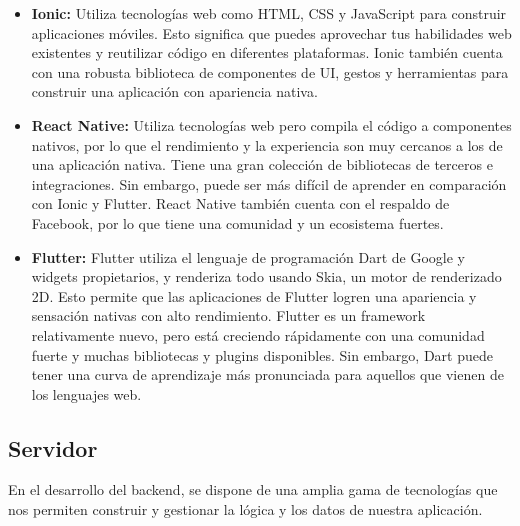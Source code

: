 \begin{itemize}
	\item \textbf{Ionic:} Utiliza tecnologías web como HTML, CSS y JavaScript para construir aplicaciones móviles. Esto significa que puedes aprovechar tus habilidades web existentes y reutilizar código en diferentes plataformas. Ionic también cuenta con una robusta biblioteca de componentes de UI, gestos y herramientas para construir una aplicación con apariencia nativa.
	\item \textbf{React Native:} Utiliza tecnologías web pero compila el código a componentes nativos, por lo que el rendimiento y la experiencia son muy cercanos a los de una aplicación nativa. Tiene una gran colección de bibliotecas de terceros e integraciones. Sin embargo, puede ser más difícil de aprender en comparación con Ionic y Flutter. React Native también cuenta con el respaldo de Facebook, por lo que tiene una comunidad y un ecosistema fuertes.
	\item \textbf{Flutter:} Flutter utiliza el lenguaje de programación Dart de Google y widgets propietarios, y renderiza todo usando Skia, un motor de renderizado 2D. Esto permite que las aplicaciones de Flutter logren una apariencia y sensación nativas con alto rendimiento. Flutter es un framework relativamente nuevo, pero está creciendo rápidamente con una comunidad fuerte y muchas bibliotecas y plugins disponibles. Sin embargo, Dart puede tener una curva de aprendizaje más pronunciada para aquellos que vienen de los lenguajes web.
\end{itemize}
\subsection{Servidor}
En el desarrollo del backend, se dispone de una amplia gama de tecnologías que nos permiten construir y gestionar la lógica y los datos de nuestra aplicación.

